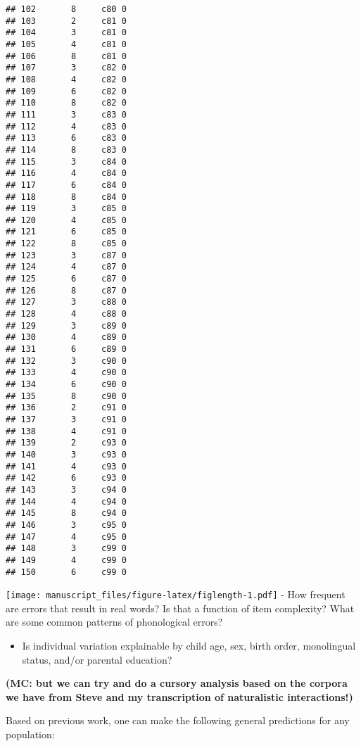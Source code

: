 \documentclass[english,,man,floatsintext]{apa6}
\providecommand{\tightlist}{%
  \setlength{\itemsep}{0pt}\setlength{\parskip}{0pt}}
\begin{document}
\begin{verbatim}
## 102       8     c80 0
## 103       2     c81 0
## 104       3     c81 0
## 105       4     c81 0
## 106       8     c81 0
## 107       3     c82 0
## 108       4     c82 0
## 109       6     c82 0
## 110       8     c82 0
## 111       3     c83 0
## 112       4     c83 0
## 113       6     c83 0
## 114       8     c83 0
## 115       3     c84 0
## 116       4     c84 0
## 117       6     c84 0
## 118       8     c84 0
## 119       3     c85 0
## 120       4     c85 0
## 121       6     c85 0
## 122       8     c85 0
## 123       3     c87 0
## 124       4     c87 0
## 125       6     c87 0
## 126       8     c87 0
## 127       3     c88 0
## 128       4     c88 0
## 129       3     c89 0
## 130       4     c89 0
## 131       6     c89 0
## 132       3     c90 0
## 133       4     c90 0
## 134       6     c90 0
## 135       8     c90 0
## 136       2     c91 0
## 137       3     c91 0
## 138       4     c91 0
## 139       2     c93 0
## 140       3     c93 0
## 141       4     c93 0
## 142       6     c93 0
## 143       3     c94 0
## 144       4     c94 0
## 145       8     c94 0
## 146       3     c95 0
## 147       4     c95 0
## 148       3     c99 0
## 149       4     c99 0
## 150       6     c99 0
\end{verbatim}

\texttt{[image: manuscript\_files/figure-latex/figlength-1.pdf]}
- How frequent are errors that result in real words? Is that a function of item complexity? What are some common patterns of phonological errors?

\begin{itemize}
\tightlist
\item
  Is individual variation explainable by child age, sex, birth order, monolingual status, and/or parental education?
\end{itemize}

\textbf{(MC: but we can try and do a cursory analysis based on the corpora we have from Steve and my transcription of naturalistic interactions!)}

Based on previous work, one can make the following general predictions for any population:
\end{document}

